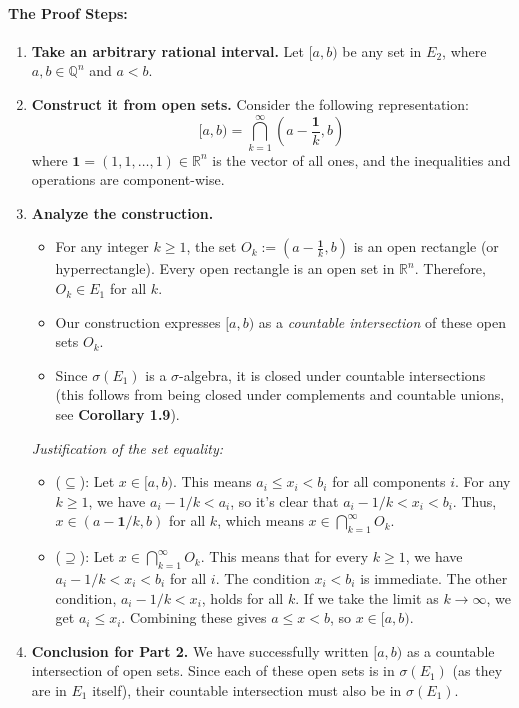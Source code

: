 \documentclass[11pt,a4paper]{article}
\theoremstyle{tutorstyle}
\begin{document}
\paragraph{The Proof Steps:}
\begin{enumerate}
    \item \textbf{Take an arbitrary rational interval.} Let $[a, b)$ be any set in $E_2$, where $a, b \in \mathbb{Q}^n$ and $a < b$.

    \item \textbf{Construct it from open sets.} Consider the following representation:
    \[ [a, b) = \bigcap_{k=1}^{\infty} \left( a - \frac{\mathbf{1}}{k}, b \right) \]
    where $\mathbf{1} = (1, 1, \dots, 1) \in \mathbb{R}^n$ is the vector of all ones, and the inequalities and operations are component-wise.

    \item \textbf{Analyze the construction.}
    \begin{itemize}
        \item For any integer $k \ge 1$, the set $O_k := \left( a - \frac{\mathbf{1}}{k}, b \right)$ is an open rectangle (or hyperrectangle). Every open rectangle is an open set in $\mathbb{R}^n$. Therefore, $O_k \in E_1$ for all $k$.
        \item Our construction expresses $[a,b)$ as a \textit{countable intersection} of these open sets $O_k$.
        \item Since $\sigma(E_1)$ is a $\sigma$-algebra, it is closed under countable intersections (this follows from being closed under complements and countable unions, see \textbf{Corollary 1.9}).
    \end{itemize}

    \textit{Justification of the set equality:}
    \begin{itemize}
        \item ($\subseteq$): Let $x \in [a, b)$. This means $a_i \le x_i < b_i$ for all components $i$. For any $k \ge 1$, we have $a_i - 1/k < a_i$, so it's clear that $a_i - 1/k < x_i < b_i$. Thus, $x \in (a - \mathbf{1}/k, b)$ for all $k$, which means $x \in \bigcap_{k=1}^{\infty} O_k$.
        \item ($\supseteq$): Let $x \in \bigcap_{k=1}^{\infty} O_k$. This means that for every $k \ge 1$, we have $a_i - 1/k < x_i < b_i$ for all $i$. The condition $x_i < b_i$ is immediate. The other condition, $a_i - 1/k < x_i$, holds for all $k$. If we take the limit as $k \to \infty$, we get $a_i \le x_i$. Combining these gives $a \le x < b$, so $x \in [a, b)$.
    \end{itemize}

    \item \textbf{Conclusion for Part 2.} We have successfully written $[a,b)$ as a countable intersection of open sets. Since each of these open sets is in $\sigma(E_1)$ (as they are in $E_1$ itself), their countable intersection must also be in $\sigma(E_1)$.
\end{enumerate}
\end{document}
